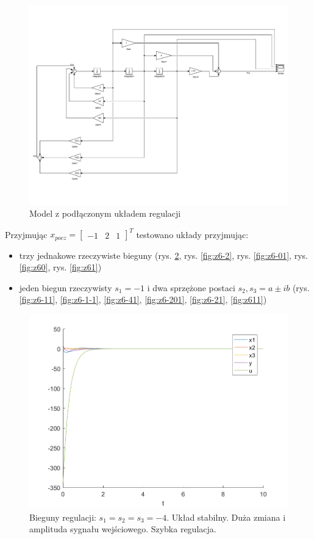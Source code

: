 \documentclass{article}
\begin{document}
\begin{figure}[H]
\centering
\includegraphics[width=0.9\linewidth]{z6}
\caption{Model z podłączonym układem regulacji}
\label{fig:z6}
\end{figure}

Przyjmując $x_{pocz} = \begin{bmatrix}-1 & 2 & 1\end{bmatrix}^T$ testowano układy przyjmując:
\begin{itemize}
\item trzy jednakowe rzeczywiste bieguny (rys. \ref{fig:z6-4}, rys. \ref{fig:z6-2}, rys. \ref{fig:z6-01}, rys. \ref{fig:z60}, rys. \ref{fig:z61})
\item jeden biegun rzeczywisty $s_1 = -1$ i dwa sprzężone postaci $s_2, s_3 = a \pm ib$ (rys. \ref{fig:z6-11}, \ref{fig:z6-1-1}, \ref{fig:z6-41}, \ref{fig:z6-201}, \ref{fig:z6-21}, \ref{fig:z611})
\end{itemize}

\begin{figure}[H]
\centering
\includegraphics[width=0.9\linewidth]{z6_-4}
\caption{Bieguny regulacji: $s_1 = s_2 = s_3 = -4$. Układ stabilny. Duża zmiana i amplituda sygnału wejściowego. Szybka regulacja.}
\label{fig:z6-4}
\end{figure}
\end{document}
